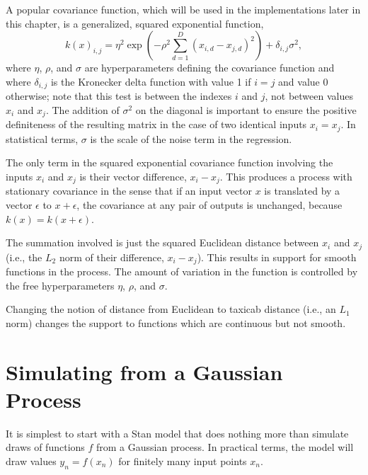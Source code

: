 A popular covariance function, which will be used in the
implementations later in this chapter, is a generalized, squared
exponential function,
\[
k(x)_{i,j}
= \eta^2 
\exp \left(
- \rho^2 \sum_{d=1}^D (x_{i,d} - x_{j,d})^2
\right)
+ \delta_{i,j} \sigma^2,
\]
where $\eta$, $\rho$, and $\sigma$ are hyperparameters defining the
covariance function and where $\delta_{i,j}$ is the Kronecker delta
function with value 1 if $i = j$ and value 0 otherwise; note that this
test is between the indexes $i$ and $j$, not between values $x_i$ and
$x_j$. The addition of $\sigma^2$ on the diagonal is important
to ensure the positive definiteness of the resulting matrix in the case of
two identical inputs $x_i = x_j$.  In statistical terms, $\sigma$ is
the scale of the noise term in the regression.

The only term in the squared exponential covariance function involving
the inputs $x_i$ and $x_j$ is their vector difference, $x_i - x_j$.
This produces a process with stationary covariance in the sense that
if an input vector $x$ is translated by a vector $\epsilon$ to $x +
\epsilon$, the covariance at any pair of outputs is unchanged, because
$k(x) = k(x+\epsilon)$.

The summation involved is just the squared Euclidean distance between
$x_i$ and $x_j$ (i.e., the $L_2$ norm of their difference, $x_i -
x_j$). This results in support for smooth functions in the process.
The amount of variation in the function is controlled by the free
hyperparameters $\eta$, $\rho$, and $\sigma$.  

Changing the notion of distance from Euclidean to taxicab distance
(i.e., an $L_1$ norm) changes the support to functions which are
continuous but not smooth.



\section{Simulating from a Gaussian Process}

It is simplest to start with a Stan model that does nothing more than
simulate draws of functions $f$ from a Gaussian process.  In practical
terms, the model will draw values $y_n = f(x_n)$ for finitely many
input points $x_n$.

